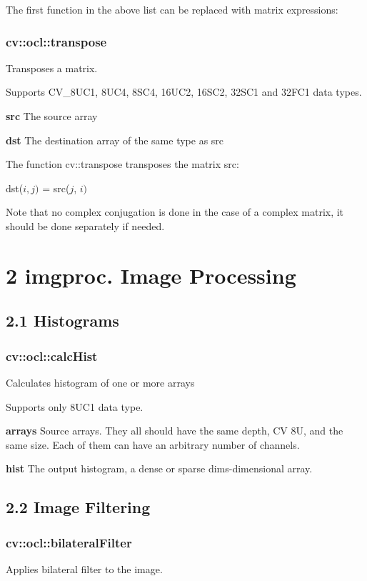 \documentclass{article}
\begin{document}
The first function in the above list can be replaced with matrix
expressions:

\newpage

\subsubsection{cv::ocl::transpose}
\label{subsubsec:mylabel29}
Transposes a matrix.

Supports CV{\_}8UC1, 8UC4, 8SC4, 16UC2, 16SC2, 32SC1 and 32FC1 data types.

\textbf{src }The source array

\textbf{dst }The destination array of the same type as src

The function cv::transpose transposes the matrix src:

dst($i, j)$ = src($j$, $i)$

Note that no complex conjugation is done in the case of a complex matrix, it
should be done separately if needed.

\newpage

\section{2 imgproc. Image Processing}
\label{sec:mylabel2}
\subsection{2.1 Histograms}
\label{subsec:mylabel3}
\subsubsection{cv::ocl::calcHist }
\label{subsubsec:mylabel30}
Calculates histogram of one or more arrays

Supports only 8UC1 data type.

\textbf{arrays }Source arrays. They all should have the same depth, CV 8U,
and the same size. Each of them can have an arbitrary number of channels.

\textbf{hist }The output histogram, a dense or sparse dims-dimensional
array.

\newpage

\subsection{2.2 Image Filtering}
\label{subsec:mylabel4}
\subsubsection{cv::ocl::bilateralFilter}
\label{subsubsec:mylabel31}
Applies bilateral filter to the image.
\end{document}

